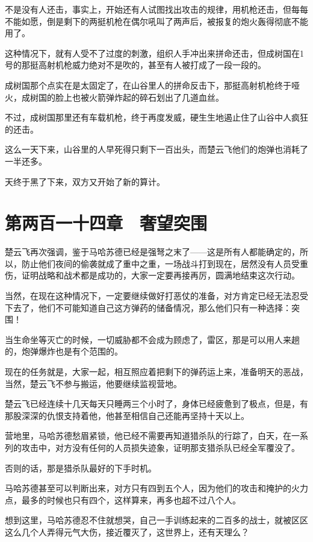 不是没有人还击，事实上，开始还有人试图找出攻击的规律，用机枪还击，但每每不能如愿，倒是剩下的两挺机枪在偶尔吼叫了两声后，被报复的炮火轰得彻底不能用了。

这种情况下，就有人受不了过度的刺激，组织人手冲出来拼命还击，但成树国在1号的那挺高射机枪威力绝对不是吹的，甚至有人被打成了一段一段的。

成树国那个点实在是太固定了，在山谷里人的拼命反击下，那挺高射机枪终于哑火，成树国的脸上也被火箭弹炸起的碎石划出了几道血丝。

不过，成树国那里还有车载机枪，终于再度发威，硬生生地遏止住了山谷中人疯狂的还击。

这么一天下来，山谷里的人早死得只剩下一百出头，而楚云飞他们的炮弹也消耗了一半还多。

天终于黑了下来，双方又开始了新的算计。

\section{第两百一十四章　奢望突围}

楚云飞再次强调，鉴于马哈苏德已经是强弩之末了——这是所有人都能确定的，所以，防止他们夜间的偷袭就成了重中之重，一场战斗打到现在，居然没有人员受重伤，证明战略和战术都是成功的，大家一定要再接再厉，圆满地结束这次行动。

当然，在现在这种情况下，一定要继续做好打恶仗的准备，对方肯定已经无法忍受下去了，他们不可能知道自己这方弹药的储备情况，那么他们只有一种选择：突围！

当生命坐等灭亡的时候，一切威胁都不会成为顾虑了，雷区，那是可以用人来趟的，炮弹爆炸也是有个范围的。

现在的任务就是，大家一起，相互照应着把剩下的弹药运上来，准备明天的恶战，当然，楚云飞不参与搬运，他要继续监视营地。

楚云飞已经连续十几天每天只睡两三个小时了，身体已经疲惫到了极点，但是，有那股深深的仇恨支持着他，他甚至相信自己还能再坚持十天以上。

营地里，马哈苏德愁眉紧锁，他已经不需要再知道猎杀队的行踪了，白天，在一系列的攻击中，对方没有任何的人员损失迹象，证明那支猎杀队已经全军覆没了。

否则的话，那是猎杀队最好的下手时机。

马哈苏德甚至可以判断出来，对方只有四到五个人，因为他们的攻击和掩护的火力点，最多的时候也只有四个，这样算来，再多也超不过八个人。

想到这里，马哈苏德忍不住就想哭，自己一手训练起来的二百多的战士，就被区区这么几个人弄得元气大伤，接近覆灭了，这世界上，还有天理么？


